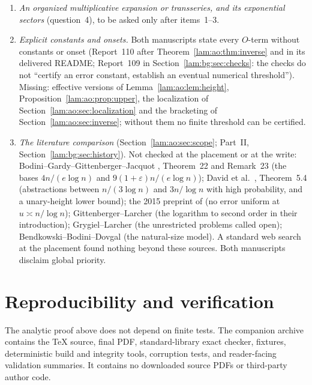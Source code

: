 \documentclass[11pt,a4paper]{article}
\numberwithin{equation}{section}
\theoremstyle{remark}
\begin{document}
\begin{enumerate}
\item \emph{An organized multiplicative expansion or transseries, and its exponential sectors} (question~4), to be asked only after items~1--3.
\item \emph{Explicit constants and onsets.} Both manuscripts state every $O$-term without constants or onset (Report~110 after Theorem~\ref{lam:ao:thm:inverse} and in its delivered README; Report~109 in Section~\ref{lam:bg:sec:checks}: the checks do not ``certify an error constant, establish an eventual numerical threshold''). Missing: effective versions of Lemma~\ref{lam:ao:lem:height}, Proposition~\ref{lam:ao:prop:upper}, the localization of Section~\ref{lam:ao:sec:localization} and the bracketing of Section~\ref{lam:ao:sec:inverse}; without them no finite threshold can be certified.
\item \emph{The literature comparison} (Section~\ref{lam:ao:sec:scope}; Part~II, Section~\ref{lam:bg:sec:history}). Not checked at the placement or at the write: Bodini--Gardy--Gittenberger--Jacquot \cite{bggj2013}, Theorem~22 and Remark~23 (the bases $4n/(e\log n)$ and $9(1+\varepsilon)n/(e\log n)$); David et al.\ \cite{david2013}, Theorem~5.4 (abstractions between $n/(3\log n)$ and $3n/\log n$ with high probability, and a unary-height lower bound); the 2015 preprint of \cite{bggg2018} (no error uniform at $u\asymp n/\log n$); Gittenberger--Larcher \cite{parameters} (the logarithm to second order in their introduction); Grygiel--Larcher \cite{unaryprofile} (the unrestricted problems called open); Bendkowski--Bodini--Dovgal \cite{natural} (the natural-size model). A standard web search at the placement found nothing beyond these sources. Both manuscripts disclaim global priority.
\end{enumerate}

\section{Reproducibility and verification}\label{lam:ao:sec:verification}
The analytic proof above does not depend on finite tests. The companion archive contains the TeX source, final PDF, standard-library exact checker, fixtures, deterministic build and integrity tools, corruption tests, and reader-facing validation summaries. It contains no downloaded source PDFs or third-party author code.
\end{document}
